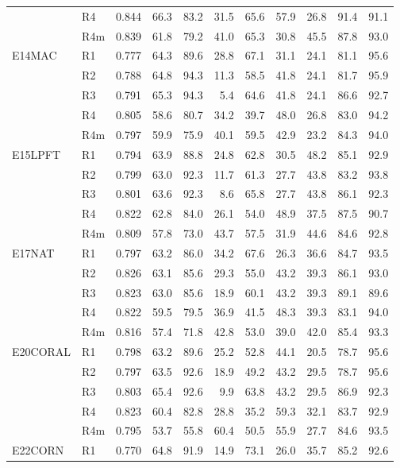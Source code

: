 \begin{table}[h]
\begin{tabular}{@{}llrrrrrrrrr@{}}
 & R4 & 0.844 & 66.3 & 83.2 & 31.5 & 65.6 & 57.9 & 26.8 & 91.4 & 91.1 \\
 & R4m & 0.839 & 61.8 & 79.2 & 41.0 & 65.3 & 30.8 & 45.5 & 87.8 & 93.0 \\
\addlinespace
E14MAC & R1 & 0.777 & 64.3 & 89.6 & 28.8 & 67.1 & 31.1 & 24.1 & 81.1 & 95.6 \\
 & R2 & 0.788 & 64.8 & 94.3 & 11.3 & 58.5 & 41.8 & 24.1 & 81.7 & 95.9 \\
 & R3 & 0.791 & 65.3 & 94.3 & 5.4 & 64.6 & 41.8 & 24.1 & 86.6 & 92.7 \\
 & R4 & 0.805 & 58.6 & 80.7 & 34.2 & 39.7 & 48.0 & 26.8 & 83.0 & 94.2 \\
 & R4m & 0.797 & 59.9 & 75.9 & 40.1 & 59.5 & 42.9 & 23.2 & 84.3 & 94.0 \\
\addlinespace
E15LPFT & R1 & 0.794 & 63.9 & 88.8 & 24.8 & 62.8 & 30.5 & 48.2 & 85.1 & 92.9 \\
 & R2 & 0.799 & 63.0 & 92.3 & 11.7 & 61.3 & 27.7 & 43.8 & 83.2 & 93.8 \\
 & R3 & 0.801 & 63.6 & 92.3 & 8.6 & 65.8 & 27.7 & 43.8 & 86.1 & 92.3 \\
 & R4 & 0.822 & 62.8 & 84.0 & 26.1 & 54.0 & 48.9 & 37.5 & 87.5 & 90.7 \\
 & R4m & 0.809 & 57.8 & 73.0 & 43.7 & 57.5 & 31.9 & 44.6 & 84.6 & 92.8 \\
\addlinespace
E17NAT & R1 & 0.797 & 63.2 & 86.0 & 34.2 & 67.6 & 26.3 & 36.6 & 84.7 & 93.5 \\
 & R2 & 0.826 & 63.1 & 85.6 & 29.3 & 55.0 & 43.2 & 39.3 & 86.1 & 93.0 \\
 & R3 & 0.823 & 63.0 & 85.6 & 18.9 & 60.1 & 43.2 & 39.3 & 89.1 & 89.6 \\
 & R4 & 0.822 & 59.5 & 79.5 & 36.9 & 41.5 & 48.3 & 39.3 & 83.1 & 94.0 \\
 & R4m & 0.816 & 57.4 & 71.8 & 42.8 & 53.0 & 39.0 & 42.0 & 85.4 & 93.3 \\
\addlinespace
E20CORAL & R1 & 0.798 & 63.2 & 89.6 & 25.2 & 52.8 & 44.1 & 20.5 & 78.7 & 95.6 \\
 & R2 & 0.797 & 63.5 & 92.6 & 18.9 & 49.2 & 43.2 & 29.5 & 78.7 & 95.6 \\
 & R3 & 0.803 & 65.4 & 92.6 & 9.9 & 63.8 & 43.2 & 29.5 & 86.9 & 92.3 \\
 & R4 & 0.823 & 60.4 & 82.8 & 28.8 & 35.2 & 59.3 & 32.1 & 83.7 & 92.9 \\
 & R4m & 0.795 & 53.7 & 55.8 & 60.4 & 50.5 & 55.9 & 27.7 & 84.6 & 93.5 \\
\addlinespace
E22CORN & R1 & 0.770 & 64.8 & 91.9 & 14.9 & 73.1 & 26.0 & 35.7 & 85.2 & 92.6 \\

\end{tabular}
\end{table}
